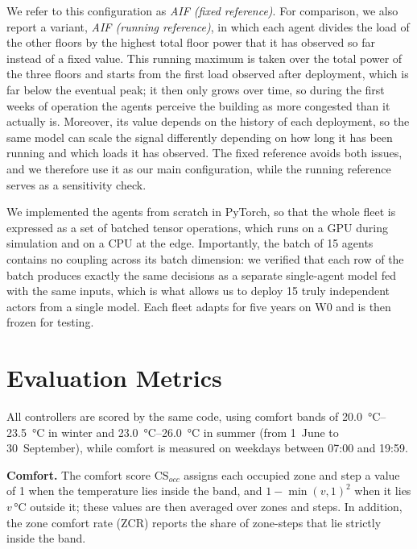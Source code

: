 \documentclass[conference]{IEEEtran}
\begin{document}
We refer to this configuration as \emph{AIF (fixed reference)}. For
comparison, we also report a variant, \emph{AIF (running reference)}, in which
each agent divides the load of the other floors by the highest total floor
power that it has observed so far instead of a fixed value. This running maximum is taken over the total power of the three floors and
starts from the first load observed after deployment, which is far below the
eventual peak; it then only grows over time, so during the first weeks of
operation the agents perceive the building as more congested than it actually
is. Moreover, its value depends on the history of each deployment, so the same
model can scale the signal differently depending on how long it has been
running and which loads it has observed. The fixed reference avoids both
issues, and we therefore use it as our main configuration, while the running
reference serves as a sensitivity check.

We implemented the agents from scratch in PyTorch, so that the whole fleet is expressed as a set of batched tensor
operations, which runs on a GPU during simulation and on a CPU at the edge.
Importantly, the batch of 15 agents contains no coupling across its batch
dimension: we verified that each row of the batch produces exactly the same
decisions as a separate single-agent model fed with the same inputs, which is
what allows us to deploy 15 truly independent actors from a single model. Each
fleet adapts for five years on W0 and is then frozen for testing.

\section{Evaluation Metrics}
\label{sec:metrics}

All controllers are scored by the same code, using comfort bands of
\SIrange{20.0}{23.5}{\celsius} in winter and \SIrange{23.0}{26.0}{\celsius} in
summer (from 1~June to 30~September), while comfort is measured on weekdays
between 07:00 and 19:59.

\textbf{Comfort.} The comfort score $\mathrm{CS}_{occ}$ assigns each occupied
zone and step a value of 1 when the temperature lies inside the band, and
$1 - \min(v,1)^2$ when it lies $v$\,\si{\celsius} outside it; these values are
then averaged over zones and steps. In addition, the zone comfort rate (ZCR)
reports the share of zone-steps that lie strictly inside the band.
\end{document}
